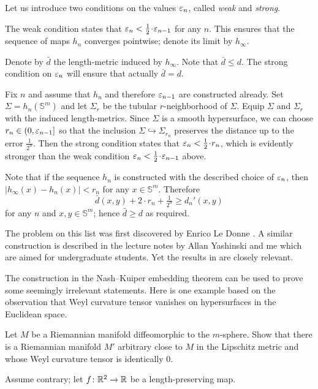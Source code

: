 Let us introduce two conditions on the values $\varepsilon_n$, called \emph{weak} and \emph{strong}.

The weak condition states that $\eps_{n}< \tfrac1{2}\cdot \eps_{n-1}$ for any $n$.
This ensures that the sequence of maps $h_n$ converges pointwise;
denote its limit by $h_\infty$.

Denote by $\bar d$ the length-metric induced by $h_\infty$.
Note that $\bar d\le d$.
The strong condition on $\varepsilon_n$ will ensure that actually $\bar d=d$.

Fix $n$ and assume that $h_n$ and therefore $\varepsilon_{n-1}$ are constructed already.
Set $\Sigma=h_n(\mathbb{S}^m)$
and let $\Sigma_r$ be the tubular $r$-neighborhood of $\Sigma$.
Equip $\Sigma$ and $\Sigma_r$ with the induced length-metrics.
Since $\Sigma$ is a smooth hypersurface, we can choose $r_n\in(0,\varepsilon_{n-1}]$ 
so that the inclusion $\Sigma\hookrightarrow \Sigma_{r_n}$ preserves the distance up to the error $\tfrac1{2^n}$.
Then the strong condition states that $\eps_n< \tfrac12\cdot r_n$, 
which is evidently stronger than the weak condition  $\eps_{n}< \tfrac1{2}\cdot \eps_{n-1}$ above.

Note that if the sequence $h_n$ is constructed with the described choice of $\varepsilon_n$,
then $|h_\infty(x)-h_n(x)|<r_n$ for any $x\in\mathbb{S}^m$.
Therefore 
\[\bar d(x,y)+2\cdot r_n+\tfrac1{2^n}\ge d_n'(x,y)\] 
for any $n$ and $x,y\in \mathbb{S}^m$;
hence $\bar d\ge d$ as required. 
\qeds


The problem
on this list was first discovered by Enrico Le Donne \cite[see][]{le-donne}.
A similar construction is described in the lecture notes by Allan Yashinski and me \cite[see][]{petrunin-yashinsky} 
which are aimed for undergraduate students. 
Yet the results in \cite{petrunin-paths} are closely relevant.

The construction in the Nash--Kuiper embedding theorem
can be used to prove some seemingly irrelevant statements.
Here is one example based on the observation that Weyl curvature tensor 
vanishes on hypersurfaces in the Euclidean space.

\begin{pr}
Let $M$ be a Riemannian manifold diffeomorphic to the $m$-sphere. 
Show that there is a Riemannian manifold $M'$ arbitrary close to $M$ in the Lipschitz metric and whose Weyl curvature tensor is identically 0.
\end{pr}

Assume contrary;
let $f\colon\mathbb{R}^2\to \mathbb{R}$ be a length-preserving map.

